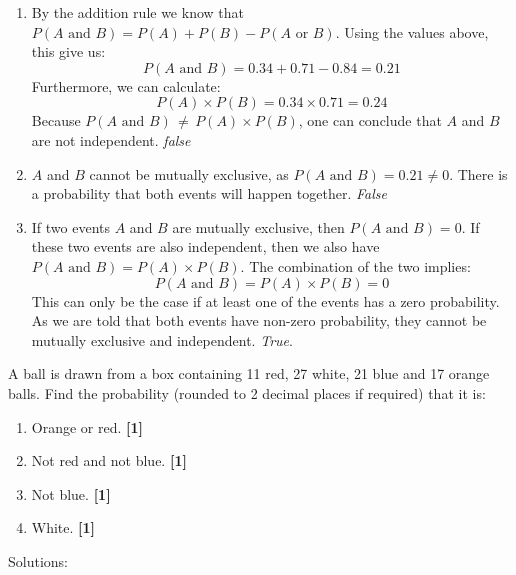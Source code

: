 \documentclass[a4paper, leqno, 12pt]{article} %
\newenvironment{top_enumerate}{
\begin{enumerate}
  \setlength{\itemsep}{2em}
  \setlength{\topsep}{-0pt}
  \setlength{\partopsep}{-0pt}
}{\end{enumerate}}
\begin{document}
\begin{top_enumerate}
\setcounter{equation}{0}  %
\begin{enumerate}
	\setlength{\topsep}{-0pt}
	\setlength{\partopsep}{-0pt}
	\setlength{\itemsep}{10pt}
			\item By the addition rule we know that $P(A \textrm{ and } B) = P(A) + P(B) - P(A \textrm{ or } B)$. Using the values above, this give us:
	\[
	P(A \textrm{ and } B) = {0.34} + {0.71} - {0.84} = {0.21}
	\]
	Furthermore, we can calculate:
	\[
	P(A)\times P(B) = {0.34} \times {0.71} = {0.24}
	\]
	Because $P(A \textrm{ and } B) \, { \ne} \, P(A)\times P(B)$, one can conclude that $A$ and $B$ are { not }independent. \emph{{false}}
	 \quad \textbf{}
		\item $A$ and $B$ cannot be mutually exclusive, as $P(A \textrm{ and } B) = {0.21} \ne 0$. There is a probability that both events will happen together. \emph{False}
	 \quad \textbf{}
		\item If two events $A$ and $B$ are mutually exclusive, then $P(A \textrm{ and } B) = 0$. If these two events are also independent, then  we also have $P(A \textrm{ and } B) = P(A)\times P(B)$. The combination of the two implies:
	\[
	P(A \textrm{ and } B) = P(A)\times P(B) = 0
	\]
	This can only be the case if at least one of the events has a zero probability. As we are told that both events have non-zero probability, they cannot be mutually exclusive and independent. \emph{True}.
	 \quad \textbf{}
\end{enumerate}\newpage
\item A ball is drawn from a box containing {11} red, {27} white, {21} blue and {17} orange balls. Find the probability (rounded to 2 decimal places if required) that it is:
 
\setcounter{equation}{0}  %
\begin{enumerate}
	\setlength{\topsep}{-0pt}
	\setlength{\partopsep}{-0pt}
	\setlength{\itemsep}{10pt}
			\item Orange or red.
	 \quad \textbf{[1]}
		\item Not red and not blue.
	 \quad \textbf{[1]}
		\item Not blue.
	 \quad \textbf{[1]}
		\item White.
	 \quad \textbf{[1]}
\end{enumerate}\addtocounter{enumi}{-1}
\item Solutions:
 

\end{top_enumerate}
\end{document}
